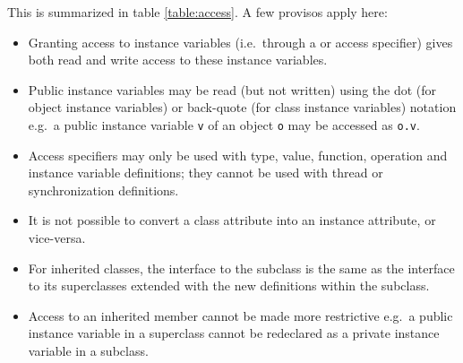 \documentclass[\pformat,12pt]{article}
\begin{document}
This is summarized in table \ref{table:access}. A few provisos apply
here: 
\begin{itemize}
\item Granting access to instance variables (i.e.\ through
a  or  access specifier) gives 
both read and write access to these instance variables.
\item Public instance variables may be read (but not written) using
  the dot (for object instance variables) or back-quote (for class
  instance variables) notation e.g.\ a public instance variable
  \texttt{v} of an object \texttt{o} may be accessed as \texttt{o.v}.
\item Access specifiers may only be used with type, value, function,
  operation and instance variable definitions; they cannot be used
  with thread or synchronization definitions.
\item It is not possible to convert a class attribute into an instance
  attribute, or vice-versa.
\item For inherited classes, the interface to the subclass is the same
  as the interface to its superclasses extended with the new
  definitions within the subclass.  
\item Access to an inherited member cannot be made more restrictive
  e.g.\ a public instance variable in a superclass cannot be
  redeclared as a private instance variable in a subclass.
\end{itemize} 
\end{document}
